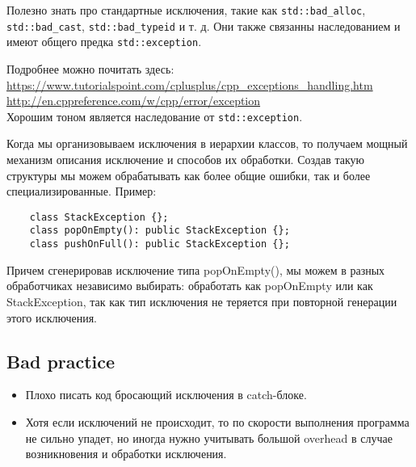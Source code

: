 Полезно знать про стандартные исключения, такие как  \texttt{std::bad_alloc}, \texttt{std::bad_cast}, \texttt{std::bad_typeid} и т. д. Они также связанны наследованием и имеют общего предка \texttt{std::exception}.

Подробнее можно почитать здесь: \\
\url{https://www.tutorialspoint.com/cplusplus/cpp_exceptions_handling.htm} \\
\url{http://en.cppreference.com/w/cpp/error/exception} \\

Хорошим тоном является наследование от \texttt{std::exception}.

Когда мы организовываем исключения в иерархии классов, то получаем мощный механизм описания исключение и способов их обработки. Создав такую структуры мы можем обрабатывать как более общие ошибки, так и более специализированные.
Пример:
\begin{verbatim}
    class StackException {};
    class popOnEmpty(): public StackException {};
    class pushOnFull(): public StackException {};
\end{verbatim}
	Причем сгенерировав исключение типа popOnEmpty(), мы можем в разных обработчиках независимо выбирать: обработать как popOnEmpty или как StackException, так как тип исключения не теряется при повторной генерации этого исключения.

\subsection{Bad practice}
\begin{itemize}
\item
Плохо писать код бросающий исключения в catch-блоке. %
\item
Хотя если исключений не происходит, то по скорости выполнения программа не сильно упадет, но иногда нужно учитывать большой overhead в случае возникновения и обработки исключения. %
\end{itemize}

